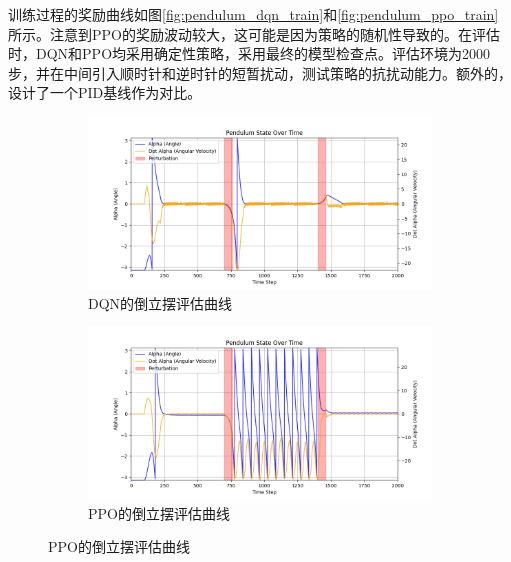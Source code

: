 \documentclass[12pt,a4paper]{article}
\begin{document}
训练过程的奖励曲线如图\ref{fig:pendulum_dqn_train}和\ref{fig:pendulum_ppo_train}所示。注意到PPO的奖励波动较大，这可能是因为策略的随机性导致的。在评估时，DQN和PPO均采用确定性策略，采用最终的模型检查点。评估环境为2000步，并在中间引入顺时针和逆时针的短暂扰动，测试策略的抗扰动能力。额外的，设计了一个PID基线作为对比。

\begin{figure}[htbp!]
    \centering
    \begin{subfigure}[b]{0.49\textwidth}
        \centering
        \includegraphics[width=\textwidth]{images/pendulum_dqn_eval.png}
        \caption{DQN的倒立摆评估曲线}
        \label{fig:pendulum_dqn_eval}
    \end{subfigure}
    \hfill
    \begin{subfigure}[b]{0.49\textwidth}
        \centering
        \includegraphics[width=\textwidth]{images/pendulum_ppo_eval.png}
        \caption{PPO的倒立摆评估曲线}
        \label{fig:pendulum_ppo_eval}
    \end{subfigure}
    
    \vspace{0.5cm} %
    

\end{figure}
\end{document}
